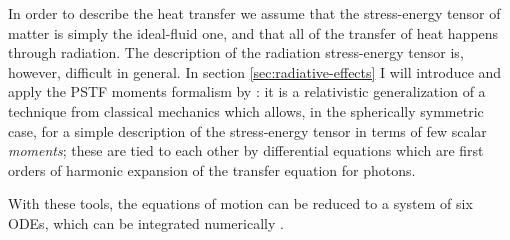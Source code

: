 \documentclass[main.tex]{subfiles}
\begin{document}
In order to describe the heat transfer we assume that the stress-energy tensor of matter is simply the ideal-fluid one, and that all of the transfer of heat happens through radiation.
The description of the radiation stress-energy tensor is, however, difficult in general.
In section \ref{sec:radiative-effects} I will introduce and apply the PSTF moments formalism by \textcite[]{Thorne:1981feb}: it is a relativistic generalization of a technique from classical mechanics which allows, in the spherically symmetric case, for a simple description of the stress-energy tensor in terms of few scalar \emph{moments}; these are tied to each other by differential equations which are first orders of harmonic expansion of the transfer equation for photons.

With these tools, the equations of motion can be reduced to a system of six ODEs, which can be integrated numerically \cite[]{NobiliTurollaZampieri:1991dec}.
\end{document}
